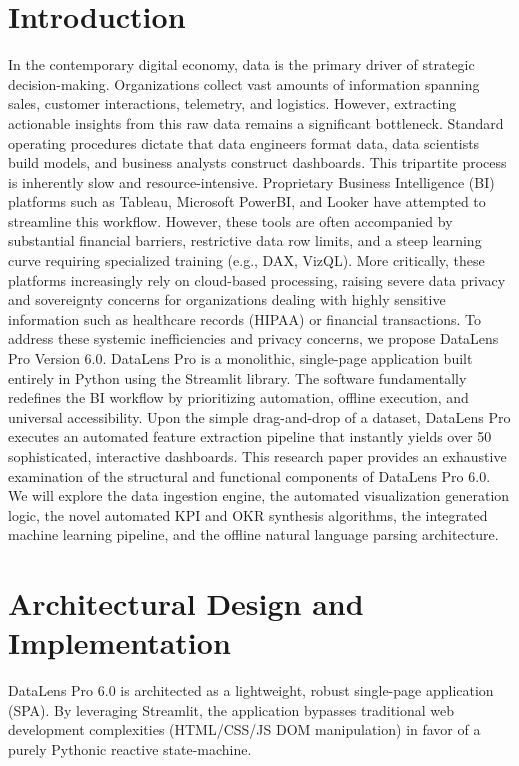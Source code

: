 \documentclass[12pt, a4paper]{article}
\begin{document}
\section{Introduction}
In the contemporary digital economy, data is the primary driver of strategic decision-making. Organizations collect vast amounts of information spanning sales, customer interactions, telemetry, and logistics. However, extracting actionable insights from this raw data remains a significant bottleneck. Standard operating procedures dictate that data engineers format data, data scientists build models, and business analysts construct dashboards. This tripartite process is inherently slow and resource-intensive.
Proprietary Business Intelligence (BI) platforms such as Tableau, Microsoft PowerBI, and Looker have attempted to streamline this workflow. However, these tools are often accompanied by substantial financial barriers, restrictive data row limits, and a steep learning curve requiring specialized training (e.g., DAX, VizQL). More critically, these platforms increasingly rely on cloud-based processing, raising severe data privacy and sovereignty concerns for organizations dealing with highly sensitive information such as healthcare records (HIPAA) or financial transactions.
To address these systemic inefficiencies and privacy concerns, we propose DataLens Pro Version 6.0. DataLens Pro is a monolithic, single-page application built entirely in Python using the Streamlit library. The software fundamentally redefines the BI workflow by prioritizing automation, offline execution, and universal accessibility. Upon the simple drag-and-drop of a dataset, DataLens Pro executes an automated feature extraction pipeline that instantly yields over 50 sophisticated, interactive dashboards. 
This research paper provides an exhaustive examination of the structural and functional components of DataLens Pro 6.0. We will explore the data ingestion engine, the automated visualization generation logic, the novel automated KPI and OKR synthesis algorithms, the integrated machine learning pipeline, and the offline natural language parsing architecture.
\section{Architectural Design and Implementation}
DataLens Pro 6.0 is architected as a lightweight, robust single-page application (SPA). By leveraging Streamlit, the application bypasses traditional web development complexities (HTML/CSS/JS DOM manipulation) in favor of a purely Pythonic reactive state-machine. 
\end{document}
